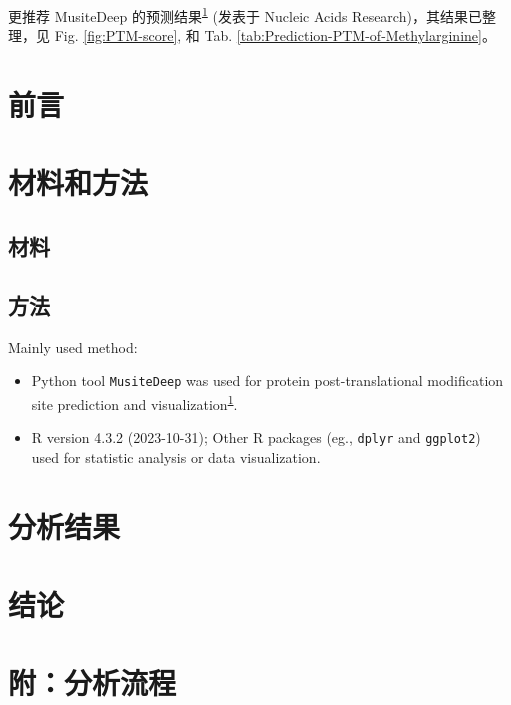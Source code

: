 \documentclass[
]{article}
\providecommand{\tightlist}{%
  \setlength{\itemsep}{0pt}\setlength{\parskip}{0pt}}
\begin{document}
更推荐 MusiteDeep 的预测结果\textsuperscript{\protect\hyperlink{ref-MusitedeepADWang2020}{1}} (发表于 Nucleic Acids Research)，其结果已整理，见
Fig. \ref{fig:PTM-score}, 和 Tab. \ref{tab:Prediction-PTM-of-Methylarginine}。

\hypertarget{introduction}{%
\section{前言}\label{introduction}}

\hypertarget{methods}{%
\section{材料和方法}\label{methods}}

\hypertarget{ux6750ux6599}{%
\subsection{材料}\label{ux6750ux6599}}

\hypertarget{ux65b9ux6cd5}{%
\subsection{方法}\label{ux65b9ux6cd5}}

Mainly used method:

\begin{itemize}
\tightlist
\item
  Python tool \texttt{MusiteDeep} was used for protein post-translational modification site prediction and visualization\textsuperscript{\protect\hyperlink{ref-MusitedeepADWang2020}{1}}.
\item
  R version 4.3.2 (2023-10-31); Other R packages (eg., \texttt{dplyr} and \texttt{ggplot2}) used for statistic analysis or data visualization.
\end{itemize}

\hypertarget{results}{%
\section{分析结果}\label{results}}

\hypertarget{dis}{%
\section{结论}\label{dis}}

\hypertarget{workflow}{%
\section{附：分析流程}\label{workflow}}
\end{document}
